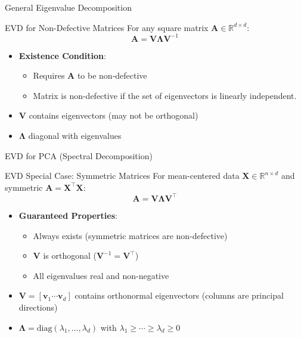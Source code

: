 \documentclass{beamer}
\begin{document}
\begin{frame}{General Eigenvalue Decomposition}
    \begin{block}{EVD for Non-Defective Matrices}
        For any square matrix $\mathbf{A} \in \mathbb{R}^{d \times d}$:
        \[
        \mathbf{A} = \mathbf{V}\mathbf{\Lambda}\mathbf{V}^{-1}
        \]
        \begin{itemize}
            \item \textbf{Existence Condition}:
            \begin{itemize}
                \item Requires $\mathbf{A}$ to be non-defective
                \item Matrix is non-defective if the set of eigenvectors is linearly independent.
            \end{itemize}
            \item $\mathbf{V}$ contains eigenvectors (may not be orthogonal)
            \item $\mathbf{\Lambda}$ diagonal with eigenvalues
        \end{itemize}
    \end{block}
\end{frame}

\begin{frame}{EVD for PCA (Spectral Decomposition)}
    \begin{block}{EVD Special Case: Symmetric Matrices}
        For mean-centered data $\mathbf{X} \in \mathbb{R}^{n \times d}$ and symmetric $\mathbf{A} = \mathbf{X}^\top\mathbf{X}$:
        \[
        \mathbf{A} = \mathbf{V}\mathbf{\Lambda}\mathbf{V}^\top
        \]
        \begin{itemize}
            \item \textbf{Guaranteed Properties}:
            \begin{itemize}
                \item Always exists (symmetric matrices are non-defective)
                \item $\mathbf{V}$ is orthogonal ($\mathbf{V}^{-1} = \mathbf{V}^\top$)
                \item All eigenvalues real and non-negative
            \end{itemize}
            \item $\mathbf{V} = [\mathbf{v}_1 \cdots \mathbf{v}_d]$ contains orthonormal eigenvectors (columns are principal directions)
            \item $\mathbf{\Lambda} = \text{diag}(\lambda_1, \ldots, \lambda_d)$ with $\lambda_1 \geq \cdots \geq \lambda_d \geq 0$
        \end{itemize}
    \end{block}
\end{frame}
\end{document}
